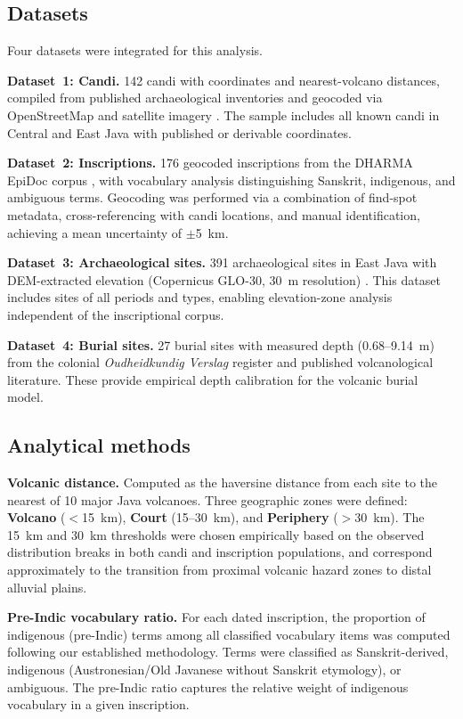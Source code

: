 \documentclass[12pt]{article}
\begin{document}
\subsection{Datasets}

Four datasets were integrated for this analysis.

\textbf{Dataset~1: Candi.} 142 candi with coordinates and nearest-volcano distances, compiled from published archaeological inventories and geocoded via OpenStreetMap and satellite imagery \citep{Degroot2009, Kinney2003}.
The sample includes all known candi in Central and East Java with published or derivable coordinates.

\textbf{Dataset~2: Inscriptions.} 176 geocoded inscriptions from the DHARMA EpiDoc corpus \citep{DHARMA2024}, with vocabulary analysis distinguishing Sanskrit, indigenous, and ambiguous terms.
Geocoding was performed via a combination of find-spot metadata, cross-referencing with candi locations, and manual identification, achieving a mean uncertainty of $\pm$5~km.

\textbf{Dataset~3: Archaeological sites.} 391 archaeological sites in East Java with DEM-extracted elevation (Copernicus GLO-30, 30~m resolution) \citep{Copernicus2019}.
This dataset includes sites of all periods and types, enabling elevation-zone analysis independent of the inscriptional corpus.

\textbf{Dataset~4: Burial sites.} 27 burial sites with measured depth (0.68--9.14~m) from the colonial \textit{Oudheidkundig Verslag} register \citep{OV1912} and published volcanological literature.
These provide empirical depth calibration for the volcanic burial model.

\subsection{Analytical methods}

\textbf{Volcanic distance.} Computed as the haversine distance from each site to the nearest of 10 major Java volcanoes.
Three geographic zones were defined: \textbf{Volcano} ($<$15~km), \textbf{Court} (15--30~km), and \textbf{Periphery} ($>$30~km).
The 15~km and 30~km thresholds were chosen empirically based on the observed distribution breaks in both candi and inscription populations, and correspond approximately to the transition from proximal volcanic hazard zones to distal alluvial plains.

\textbf{Pre-Indic vocabulary ratio.} For each dated inscription, the proportion of indigenous (pre-Indic) terms among all classified vocabulary items was computed following our established methodology.
Terms were classified as Sanskrit-derived, indigenous (Austronesian/Old Javanese without Sanskrit etymology), or ambiguous.
The pre-Indic ratio captures the relative weight of indigenous vocabulary in a given inscription.
\end{document}

